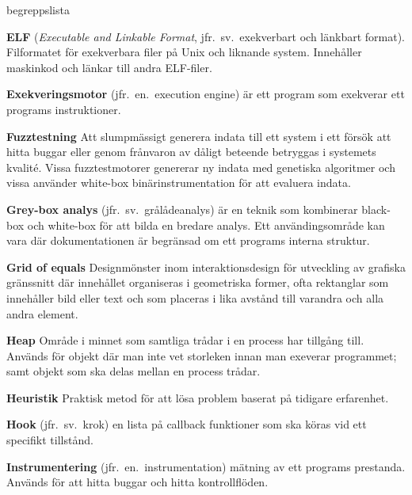 \begin{labeling}{begreppslista}
    \item [\textbf{ELF}] (\emph{Executable and Linkable Format},
          jfr.\ sv.\ exekverbart och länkbart format). Filformatet för
    exekverbara filer på Unix och liknande system. Innehåller
    maskinkod och länkar till andra ELF-filer.

    \item [\textbf{Exekveringsmotor}] (jfr.\ en.\ execution engine) är
    ett program som exekverar ett programs instruktioner.

    \item [\textbf{Fuzztestning}] Att slumpmässigt generera indata
    till ett system i ett försök att hitta buggar eller genom
    frånvaron av dåligt beteende betryggas i systemets
    kvalité. Vissa fuzztestmotorer genererar ny indata med
    genetiska algoritmer och vissa använder white-box
    binärinstrumentation för att evaluera indata.

    \item [\textbf{Grey-box analys}] (jfr.\ sv.\ grålådeanalys) är en
    teknik som kombinerar black-box och white-box för att bilda en
    bredare analys. Ett användingsområde kan vara där
    dokumentationen är begränsad om ett programs interna struktur.

    \item [\textbf{Grid of equals}] Designmönster inom
    interaktionsdesign för utveckling av grafiska gränssnitt där
    innehållet organiseras i geometriska former, ofta rektanglar
    som innehåller bild eller text och som placeras i lika avstånd
    till varandra och alla andra element.

    \item [\textbf{Heap}] Område i minnet som samtliga trådar i en
    process har tillgång till. Används för objekt där man inte vet
    storleken innan man exeverar programmet; samt objekt som ska
    delas mellan en process trådar.

    \item [\textbf{Heuristik}] Praktisk metod för att lösa problem
    baserat på tidigare erfarenhet.

    \item [\textbf{Hook}] (jfr.\ sv.\ krok) en lista på callback
    funktioner som ska köras vid ett specifikt tillstånd.

    \item [\textbf{Instrumentering}] (jfr.\ en.\ instrumentation)
    mätning av ett programs prestanda. Används för att hitta
    buggar och hitta kontrollflöden.


\end{labeling}

